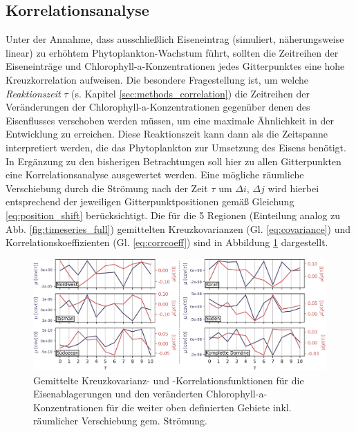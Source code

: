 \documentclass[12pt,a4paper,onecolumn]{scrartcl}
\begin{document}
\subsection{Korrelationsanalyse} \label{sec:correlation_analysis}
Unter der Annahme, dass ausschließlich Eiseneintrag (simuliert, näherungsweise linear) zu erhöhtem Phytoplankton-Wachstum führt, sollten die Zeitreihen der Eiseneinträge und Chlorophyll-a-Konzentrationen jedes Gitterpunktes eine hohe Kreuzkorrelation aufweisen. Die besondere Fragestellung ist, um welche \textit{Reaktionszeit} $\tau$ (s. Kapitel \ref{sec:methods_correlation}) die Zeitreihen der Veränderungen der Chlorophyll-a-Konzentrationen gegenüber denen des Eisenflusses verschoben werden müssen, um eine maximale Ähnlichkeit in der Entwicklung zu erreichen. Diese Reaktionszeit kann dann als die Zeitspanne interpretiert werden, die das Phytoplankton zur Umsetzung des Eisens benötigt. In Ergänzung zu den bisherigen Betrachtungen soll hier zu allen Gitterpunkten eine Korrelationsanalyse ausgewertet werden. Eine mögliche räumliche Verschiebung durch die Strömung nach der Zeit $\tau$ um $\Delta i$, $\Delta j$ wird hierbei entsprechend der jeweiligen Gitterpunktpositionen gemäß Gleichung \ref{eq:position_shift} berücksichtigt. Die für die 5 Regionen (Einteilung analog zu Abb. \ref{fig:timeseries_full}) gemittelten Kreuzkovarianzen (Gl. \ref{eq:covariance}) und Korrelationskoeffizienten (Gl. \ref{eq:corrcoeff}) sind in Abbildung \ref{fig:section_cross_corr} dargestellt.
\begin{figure}[!htb]
\includegraphics[width=\textwidth]{bilder/section_crosscorr_noadv.png}
\caption{Gemittelte Kreuzkovarianz- und -Korrelationsfunktionen für die Eisenablagerungen und den veränderten Chlorophyll-a-Konzentrationen für die weiter oben definierten Gebiete inkl. räumlicher Verschiebung gem. Strömung.} \label{fig:section_cross_corr}
\end{figure}
\end{document}
